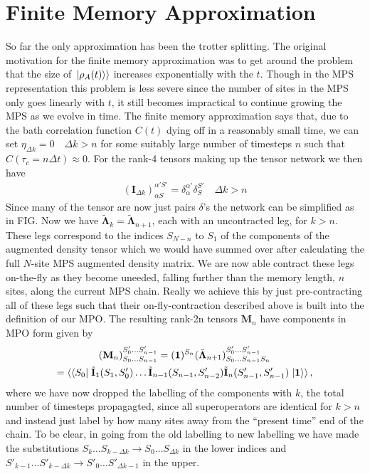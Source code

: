 \documentclass[a4paper, aps, pra,twocolumn]{revtex4-1}
\newcommand{\dket}[1]{\left.\Ket{#1}\right\rangle}
\newcommand{\dbra}[1]{\left\langle\Bra{#1}\right.}
\begin{document}
\section{Finite Memory Approximation}
So far the only approximation has been the trotter splitting. The original motivation for the finite memory approximation was to get around the problem that the size of $\dket{\rho_A(t)}$ increases exponentially with the $t$. Though in the MPS representation this problem is less severe since the number of sites in the MPS only goes linearly with $t$, it still becomes impractical to continue growing the MPS as we evolve in time. The finite memory approximation says that, due to the bath correlation function $C(t)$ dying off in a reasonably small time, we can set $\eta_{\Delta k}=0 \quad \Delta k> n$ for some suitably large number of timesteps $n$ such that $C(\tau_c=n\Delta t)\approx 0$.
For the rank-4 tensors making up the tensor network we then have
\begin{align}
(\mathbf{I}_{\Delta k})_{\alpha S}^{\alpha' S'}= \delta_{\alpha}^{\alpha'}\delta_{S}^{S'} \quad \Delta k >n
\end{align}
Since many of the tensor are now just pairs $\delta$'s the network can be simplified as in FIG. 
Now we have $\tilde{\mathbf{\Lambda}}_k=\tilde{\mathbf{\Lambda}}_{ n+1}$, each with an uncontracted leg, for $k>n$.
These legs correspond to the indices $S_{N-n}$ to $S_1$ of the components of the augmented density tensor which we would have summed over after calculating the full $N$-site MPS augmented density matrix. We are now able contract these legs on-the-fly as they become uneeded, falling further than the memory length, $n$ sites, along the current MPS chain. Really we achieve this by just pre-contracting all of these legs such that their on-fly-contraction described above is built into the definition of our MPO. The resulting rank-2n tensors $\mathbf{M}_{n}$ have components in MPO form given by
\begin{multline}
 (\mathbf{M}_{n})^{S'_0 \ldots S'_{n-1}}_{S_0 \ldots S_{n-1}}=(\mathbf{1})^{S_{n}}(\tilde{\mathbf{\Lambda}}_{n+1})^{S'_0 \ldots S'_{n-1}}_{S_0 \ldots S_{n-1} S_{n}} \\=\dbra{S_0}\tilde{\mathbf{I}}_{1}(S_{1},S'_{0}) \ldots \tilde{\mathbf{I}}_{n-1}(S_{n-1},S'_{n-2})\tilde{\mathbf{I}}_{n}(S'_{n-1},S'_{n-1})\dket{\mathbf{1}},
\end{multline}
where we have now dropped the labelling of the components with $k$, the total number of timesteps propagagted, since all superoperators are identical for $k>n$ and instead just label by how many sites away from the ``present time'' end of the chain. To be clear, in going from the old labelling to new labelling we have made the substitutions $S_k \ldots S_{k-\Delta k} \to S_0 \ldots S_{\Delta k}$ in the lower indices and $S'_{k-1} \ldots S'_{k-\Delta k} \to S'_0 \ldots S'_{\Delta k-1}$ in the upper.
\end{document}
